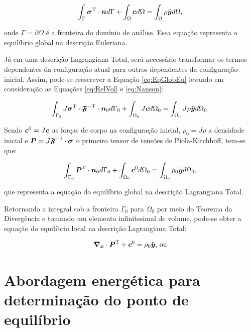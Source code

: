 \begin{equation}
    \int_\Gamma{\boldsymbol{\sigma}^\mathrm{T}\cdot\boldsymbol{n}d\Gamma}+\int_\Omega{\boldsymbol{c}d\Omega}=\int_\Omega{\rho\ddot{\boldsymbol{y}}d\Omega}
    \text{,}
    \label{eq:EqGlobEu}
\end{equation}

\noindent onde $\Gamma=\partial\Omega$ é a fronteira do domínio de análise. Essa equação representa o equilíbrio global na descrição Euleriana.

Já em uma descrição Lagrangiana Total, será necessário transformar os termos dependentes da configuração atual para outros dependentes da configuração inicial. Assim, pode-se reescrever a Equação \eqref{eq:EqGlobEu} levando em consideração as Equações \eqref{eq:RelVol} e \eqref{eq:Nanson}:

\begin{equation}
    \int_{\Gamma_0}{J\boldsymbol{\sigma}^\mathrm{T}\cdot\boldsymbol{\mathfrak{F}}^\mathrm{-T}\cdot\boldsymbol{n}_0d\Gamma_0}+\int_{\Omega_0}{J\boldsymbol{c}d\Omega_0}=\int_{\Omega_0}{J\rho\ddot{\boldsymbol{y}}d\Omega_0}
    \text{.}
\end{equation}

\noindent Sendo $\boldsymbol{c}^0=J\boldsymbol{c}$ as forças de corpo na configuração inicial, $\rho_0=J\rho$ a densidade inicial e $\boldsymbol{P}=J\boldsymbol{\mathfrak{F}}^{-1}\cdot\boldsymbol{\sigma}$ o primeiro tensor de tensões de Piola-Kirchhoff, tem-se que:

\begin{equation}
    \int_{\Gamma_0}{\boldsymbol{P}^\mathrm{T}\cdot\boldsymbol{n}_0d\Gamma_0}+\int_{\Omega_0}{\boldsymbol{c}^0d\Omega_0}=\int_{\Omega_0}{\rho_0\ddot{\boldsymbol{y}}d\Omega_0}\text{,}
\end{equation}

\noindent que representa a equação do equilíbrio global na descrição Lagrangiana Total.

Retornando a integral sob a fronteira $\Gamma_0$ para $\Omega_0$ por meio do Teorema da Divergência e tomando um elemento infinitesimal de volume, pode-se obter a equação do equilíbrio local na descrição Lagrangiana Total:

\begin{equation}
    \boldsymbol{\nabla_x}\cdot\boldsymbol{P}^\mathrm{T}+\boldsymbol{c}^0=\rho_0\ddot{\boldsymbol{y}}\text{, ou}
\end{equation}

\section{Abordagem energética para determinação do ponto de equilíbrio}

